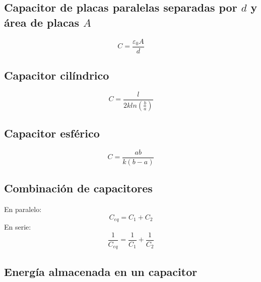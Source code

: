 \documentclass{report}
\begin{document}
    \subsection*{Capacitor de placas paralelas separadas por $d$ y área de placas $A$}

      \begin{equation*}
        C=\frac{\varepsilon_0A}{d}
      \end{equation*}

    \subsection*{Capacitor cilíndrico}

      \begin{equation*}
        C=\frac{l}{2kln(\frac{b}{a})}
      \end{equation*}

    \subsection*{Capacitor esférico}

      \begin{equation*}
        C=\frac{ab}{k(b-a)}
      \end{equation*}

    \subsection*{Combinación de capacitores}
      
      En paralelo:\\
      \begin{equation*}
        C_{eq}=C_1+C_2
      \end{equation*}
      \indent En serie:\\
      \begin{equation*}
        \frac{1}{C_{eq}}=\frac{1}{C_1}+\frac{1}{C_2}
      \end{equation*}

    \subsection*{Energía almacenada en un capacitor}
\end{document}
